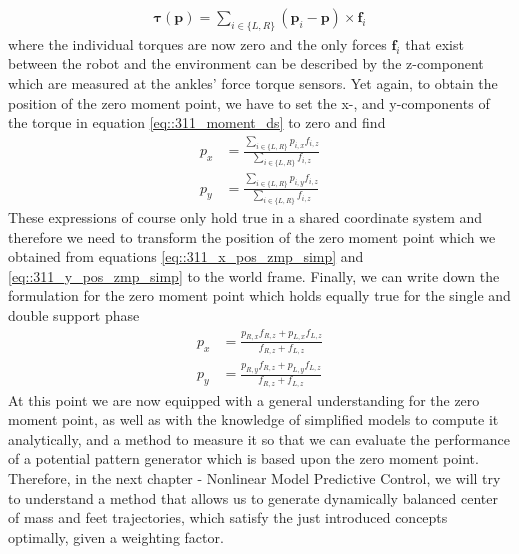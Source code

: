 \begin{align}
	\bm{\tau}(\bm{p}) = \sum_{i\in\{L, R\}} (\bm{p}_i - \bm{p})\times\bm{f}_i
	\label{eq::311_moment_ds}
\end{align}
where the individual torques are now zero and the only forces $\bm{f}_i$ that exist between the robot and the environment can be described by the z-component which are measured at the ankles' force torque sensors. Yet again, to obtain the position of the zero moment point, we have to set the x-, and y-components of the torque in equation \ref{eq::311_moment_ds} to zero and find
\begin{align}
	p_x &= \frac{\sum_{i\in\{L, R\}}p_{i,x}f_{i,z}}{\sum_{i\in\{L, R\}}f_{i,z}} \\
	p_y &= \frac{\sum_{i\in\{L, R\}}p_{i,y}f_{i,z}}{\sum_{i\in\{L, R\}}f_{i,z}}
\end{align}
These expressions of course only hold true in a shared coordinate system and therefore we need to transform the position of the zero moment point which we obtained from equations \ref{eq::311_x_pos_zmp_simp} and \ref{eq::311_y_pos_zmp_simp} to the world frame. Finally, we can write down the formulation for the zero moment point which holds equally true for the single and double support phase
\begin{align}
	p_x &= \frac{p_{R,x}f_{R,z}+p_{L,x}f_{L,z}}{f_{R,z}+f_{L,z}}  \\
	p_y &= \frac{p_{R,y}f_{R,z}+p_{L,y}f_{L,z}}{f_{R,z}+f_{L,z}}
\end{align}
At this point we are now equipped with a general understanding for the zero moment point, as well as with the knowledge of simplified models to compute it analytically, and a method to measure it so that we can evaluate the performance of a potential pattern generator which is based upon the zero moment point. Therefore, in the next chapter - Nonlinear Model Predictive Control, we will try to understand a method that allows us to generate dynamically balanced center of mass and feet trajectories, which satisfy the just introduced concepts optimally, given a weighting factor.
